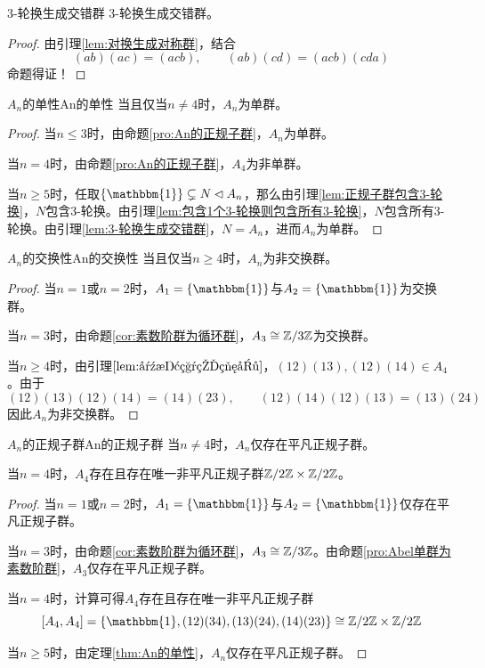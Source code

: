 \begin{lemma}{}{3-轮换生成交错群}
	$3$-轮换生成交错群。
\end{lemma}

\begin{proof}
	由引理\ref{lem:对换生成对称群}，结合
	$$
	(ab)(ac)=(acb),\qquad
	(ab)(cd)=(acb)(cda)
	$$
	命题得证！
\end{proof}

\begin{theorem}{$A_n$的单性}{An的单性}
	当且仅当$n\ne 4$时，$A_n$为单群。
\end{theorem}

\begin{proof}
	当$n\le 3$时，由命题\ref{pro:An的正规子群}，$A_n$为单群。
	
	当$n=4$时，由命题\ref{pro:An的正规子群}，$A_4$为非单群。
	
	当$n\ge 5$时，任取$\{\mathbbm{1}\}\subsetneq N\lhd A_n$，那么由引理\ref{lem:正规子群包含3-轮换}，$N$包含$3$-轮换。由引理\ref{lem:包含1个3-轮换则包含所有3-轮换}，$N$包含所有$3$-轮换。由引理\ref{lem:3-轮换生成交错群}，$N=A_n$，进而$A_n$为单群。
\end{proof}

\begin{proposition}{$A_n$的交换性}{An的交换性}
	当且仅当$n\ge 4$时，$A_n$为非交换群。
\end{proposition}

\begin{proof}
	当$n=1$或$n=2$时，$A_1=\{\mathbbm{1}\}$与$A_2=\{\mathbbm{1}\}$为交换群。
	
	当$n=3$时，由命题\ref{cor:素数阶群为循环群}，$A_3\cong\mathbb{Z}/3\mathbb{Z}$为交换群。
	
	当$n\ge 4$时，由引理$\ref{lem:对换积的符号}$，$(12)(13),(12)(14)\in A_4$。由于
	$$
	(12)(13)(12)(14)=(14)(23),\qquad 
	(12)(14)(12)(13)=(13)(24)
	$$
	因此$A_n$为非交换群。
\end{proof}

\begin{proposition}{$A_n$的正规子群}{An的正规子群}
	当$n\ne 4$时，$A_n$仅存在平凡正规子群。
	
	当$n=4$时，$A_4$存在且存在唯一非平凡正规子群$\mathbb{Z}/2\mathbb{Z}\times\mathbb{Z}/2\mathbb{Z}$。
\end{proposition}

\begin{proof}
	当$n=1$或$n=2$时，$A_1=\{\mathbbm{1}\}$与$A_2=\{\mathbbm{1}\}$仅存在平凡正规子群。
	
	当$n=3$时，由命题\ref{cor:素数阶群为循环群}，$A_3\cong\mathbb{Z}/3\mathbb{Z}$。由命题\ref{pro:Abel单群为素数阶群}，$A_3$仅存在平凡正规子群。
	
	当$n=4$时，计算可得$A_4$存在且存在唯一非平凡正规子群
	$$
	[A_4,A_4]=\{ \mathbbm{1},(12)(34),(13)(24),(14)(23) \}\cong \Z/2\Z\times\Z/2\Z
	$$
	
	当$n\ge 5$时，由定理\ref{thm:An的单性}，$A_n$仅存在平凡正规子群。
\end{proof}

